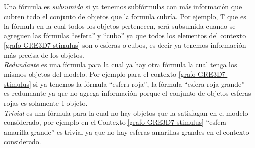 Una f\'ormula es {\it subsumida} si ya tenemos subf\'ormulas con m\'as informaci\'on que cubren todo el conjunto de objetos que la formula cubr\'ia. Por ejemplo, T que es la f\'ormula en la cual todos los objetos pertenecen, ser\'a subsumida cuando se agreguen las f\'ormulas ``esfera'' y ``cubo'' ya que todos los elementos del contexto \ref{grafo-GRE3D7-stimulus} son o esferas o cubos, es decir ya tenemos informaci\'on m\'as precisa de los objetos.\\

{\it Redundante} es una f\'ormula para la cual ya hay otra f\'ormula la cual tenga los mismos objetos del modelo. Por ejemplo para el contexto \ref{grafo-GRE3D7-stimulus} si ya tenemos la f\'ormula ``esfera roja'', la f\'ormula ``esfera roja grande'' es redundante ya que no agrega informaci\'on porque el conjunto de objetos esferas rojas es solamente 1 objeto.\\

{\it Trivial} es una f\'ormula para la cual no hay objetos que la satisfagan en el modelo considerado, por ejemplo en el Contexto \ref{grafo-GRE3D7-stimulus} ``esfera amarilla grande'' es trivial ya que no hay esferas amarillas grandes en el contexto considerado.

